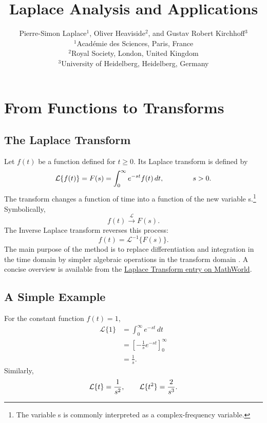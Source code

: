 \documentclass{article}
\title{Laplace Analysis and Applications}
\author{
Pierre-Simon Laplace$^{1}$, Oliver Heaviside$^{2}$, and Gustav Robert Kirchhoff$^{3}$\\[6pt]
\small $^{1}$Acad\'emie des Sciences, Paris, France\\
\small $^{2}$Royal Society, London, United Kingdom\\
\small $^{3}$University of Heidelberg, Heidelberg, Germany
}
\date{}
\begin{document}
\maketitle
\section{From Functions to Transforms}
\subsection{The Laplace Transform}
Let $f(t)$ be a function defined for $t \geq 0$. Its Laplace transform is defined by
\begin{equation}
\mathcal{L}\{f(t)\} = F(s) = \int_{0}^{\infty} e^{-st} f(t)\,dt, \hspace{40px} s > 0.
\end{equation}
The transform changes a function of time into a function of the new variable s.\footnote{The variable s is commonly interpreted as a complex-frequency variable.} Symbolically,
$$ f(t) \xrightarrow{\mathcal{L}} F(s). $$
The Inverse Laplace transform reverses this process:
\begin{equation}
f(t) = \mathcal{L}^{-1} \{F(s)\}.
\end{equation}
The main purpose of the method is to replace differentiation and integration in the time domain
by simpler algebraic operations in the transform domain \cite{kreyszig2011}. A concise overview is available from
the \href{https://mathworld.wolfram.com/LaplaceTransform.html}{Laplace Transform entry on MathWorld}.
\subsection{A Simple Example}
For the constant function $f(t) = 1$,
\begin{equation}
\begin{aligned}
\mathcal{L}\{1\}
&= \int_{0}^{\infty} e^{-st}\,dt \\
&= \left[-\frac{1}{s}e^{-st}\right]_{0}^{\infty} \\
&= \frac{1}{s}.
\end{aligned}
\end{equation}
Similarly,
\begin{equation}
\begin{aligned}
\mathcal{L}\{t\} = \frac{1}{s^2}, \hspace{20px} \mathcal{L}\{t^2\} = \frac{2}{s^3}.
\end{aligned}
\end{equation}
\end{document}
